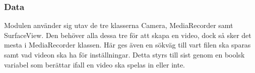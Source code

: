 \subsubsection{Data}
Modulen använder sig utav de tre klasserna Camera, MediaRecorder samt SurfaceView. Den behöver alla dessa tre för att skapa en video, dock så sker det mesta i MediaRecorder klassen. Här ges även en sökväg till vart filen ska sparas samt vad videon ska ha för inställningar. Detta styrs till sist genom en boolsk variabel som berättar ifall en video ska spelas in eller inte.
